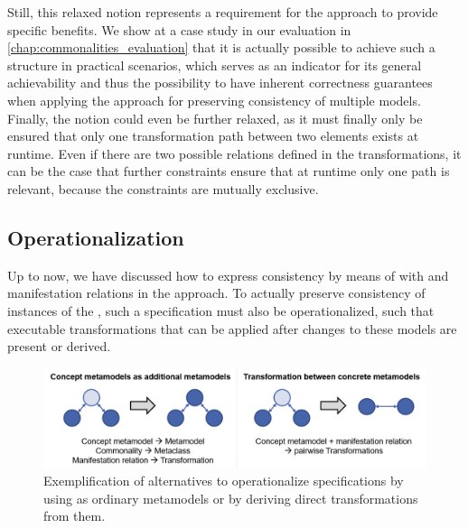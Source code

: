 Still, this relaxed notion represents a requirement for the \commonalities approach to provide specific benefits.
We show at a case study in our evaluation in \autoref{chap:commonalities_evaluation} that it is actually possible to achieve such a structure in practical scenarios, which serves as an indicator for its general achievability and thus the possibility to have inherent correctness guarantees when applying the \commonalities approach for preserving consistency of multiple models.
Finally, the notion could even be further relaxed, as it must finally only be ensured that only one transformation path between two elements exists at runtime.
Even if there are two possible relations defined in the transformations, it can be the case that further constraints ensure that at runtime only one path is relevant, because the constraints are mutually exclusive.



\subsection{Operationalization}
\label{chap:improvement:commonalities:operationalization}

Up to now, we have discussed how to express consistency by means of \conceptmetamodels with \commonalities and manifestation relations in the \commonalities approach.
To actually preserve consistency of instances of the \concretemetamodels, such a specification must also be operationalized, such that executable transformations that can be applied after changes to these models are present or derived.

\begin{figure}
    \centering
    \includegraphics[width=\textwidth]{figures/quality/improvement/operationalization_alternatives.png}
    \caption[Alternatives for \commonalities operationalization]{Exemplification of alternatives to operationalize \commonalities specifications by using \conceptmetamodels as ordinary metamodels or by deriving direct transformations from them.}
    \label{fig:improvement:operationalization_alternatives}
\end{figure}

